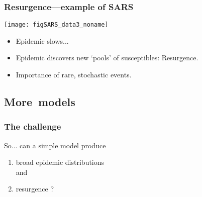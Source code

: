 \begin{frame}
  \frametitle{Resurgence---example of SARS}

  \texttt{[image: figSARS\_data3\_noname]}

  \begin{itemize}
  \item<2-> Epidemic slows...  \\
  \item<4->Epidemic discovers new `pools' of susceptibles: \alert{Resurgence}.
  \item<5-> \alert{Importance of rare, stochastic events.}
  \end{itemize}

\end{frame}



%


\subsection{More\ models}

\begin{frame}
  \frametitle{The challenge}

  \begin{block}{So...  can a simple model produce}
    \begin{enumerate}
    \item \alert{broad epidemic distributions} \\
      and
    \item \alert{resurgence} ?
    \end{enumerate}
  \end{block}
  
  
\end{frame}


